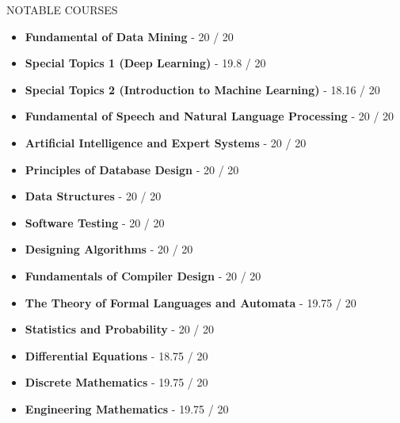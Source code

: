 \documentclass[]{CV}
\begin{document}
\begin{section}{NOTABLE COURSES}
\begin{multicols}{2}
    \begin{itemize}
	\item \textbf{Fundamental of Data Mining} - 20 / 20
	\item \textbf{Special Topics 1 (Deep Learning)} - 19.8 / 20
	\item \textbf{Special Topics 2 (Introduction to Machine Learning)} - 18.16 / 20
	\item \textbf{Fundamental of Speech and Natural Language Processing} - 20 / 20
	\item \textbf{Artificial Intelligence and Expert Systems} - 20 / 20
	
	\item \textbf{Principles of Database Design} - 20 / 20
	\item \textbf{Data Structures} - 20 / 20
	\item \textbf{Software Testing} - 20 / 20
	\item \textbf{Designing Algorithms} - 20 / 20
	\item \textbf{Fundamentals of Compiler Design} - 20 / 20
	\item \textbf{The Theory of Formal Languages ​​and Automata} - 19.75 / 20
	
	\item \textbf{Statistics and Probability} - 20 / 20
	\item \textbf{Differential Equations} - 18.75 / 20
	\item \textbf{Discrete Mathematics} - 19.75 / 20
	\item \textbf{Engineering Mathematics} - 19.75 / 20
    \end{itemize}
    \end{multicols}
\end{section}
\end{document}
